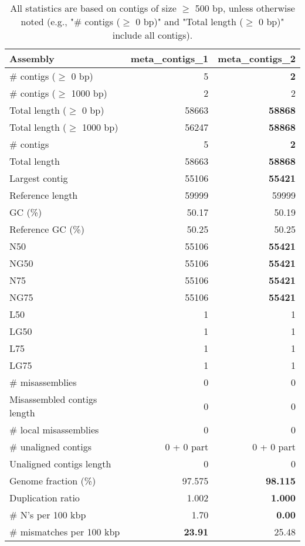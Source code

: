 \documentclass[12pt,a4paper]{article}
\begin{document}
\begin{table}[ht]
\begin{center}
\caption{All statistics are based on contigs of size $\geq$ 500 bp, unless otherwise noted (e.g., "\# contigs ($\geq$ 0 bp)" and "Total length ($\geq$ 0 bp)" include all contigs).}
\begin{tabular}{|l*{2}{|r}|}
\hline
Assembly & meta\_contigs\_1 & meta\_contigs\_2 \\ \hline
\# contigs ($\geq$ 0 bp) & 5 & {\bf 2} \\ \hline
\# contigs ($\geq$ 1000 bp) & 2 & 2 \\ \hline
Total length ($\geq$ 0 bp) & 58663 & {\bf 58868} \\ \hline
Total length ($\geq$ 1000 bp) & 56247 & {\bf 58868} \\ \hline
\# contigs & 5 & {\bf 2} \\ \hline
Total length & 58663 & {\bf 58868} \\ \hline
Largest contig & 55106 & {\bf 55421} \\ \hline
Reference length & 59999 & 59999 \\ \hline
GC (\%) & 50.17 & 50.19 \\ \hline
Reference GC (\%) & 50.25 & 50.25 \\ \hline
N50 & 55106 & {\bf 55421} \\ \hline
NG50 & 55106 & {\bf 55421} \\ \hline
N75 & 55106 & {\bf 55421} \\ \hline
NG75 & 55106 & {\bf 55421} \\ \hline
L50 & 1 & 1 \\ \hline
LG50 & 1 & 1 \\ \hline
L75 & 1 & 1 \\ \hline
LG75 & 1 & 1 \\ \hline
\# misassemblies & 0 & 0 \\ \hline
Misassembled contigs length & 0 & 0 \\ \hline
\# local misassemblies & 0 & 0 \\ \hline
\# unaligned contigs & 0 + 0 part & 0 + 0 part \\ \hline
Unaligned contigs length & 0 & 0 \\ \hline
Genome fraction (\%) & 97.575 & {\bf 98.115} \\ \hline
Duplication ratio & 1.002 & {\bf 1.000} \\ \hline
\# N's per 100 kbp & 1.70 & {\bf 0.00} \\ \hline
\# mismatches per 100 kbp & {\bf 23.91} & 25.48 \\ \hline

\end{tabular}
\end{center}
\end{table}
\end{document}
